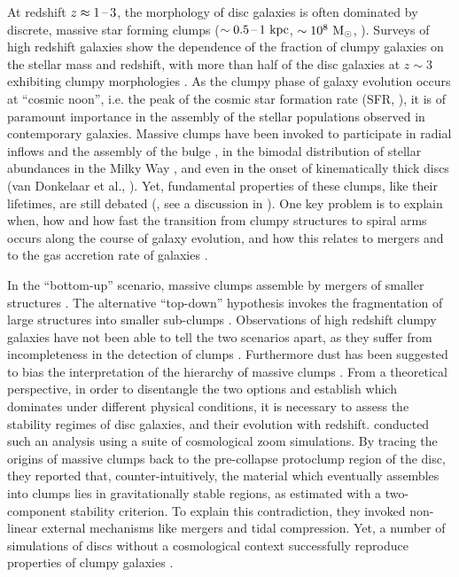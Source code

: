 \documentclass[useAMS,usenatbib]{mnras}
\begin{document}
At redshift $z\approx 1\textrm{\,--\,} 3$, the morphology of disc galaxies is often dominated by discrete, massive star forming clumps ($\sim 0.5 \textrm{\,--\,} 1 \mathrm{~kpc}$, $\sim 10^8 \mathrm{~M}_{\odot}$, \citealt{Cowie1995, Elmegreen2007, Elmegreen2009, Wuyts2012, Swinbank2015, Zanella2015, Fisher2017, Guo2018}). Surveys of high redshift galaxies show the dependence of the fraction of clumpy galaxies on the stellar mass and redshift, with more than half of the disc galaxies at $z\sim 3$ exhibiting clumpy morphologies \citep{Guo2015}. As the clumpy phase of galaxy evolution occurs at ``cosmic noon'', i.e. the peak of the cosmic star formation rate (SFR, \citealt{Madau2014}), it is of paramount importance in the assembly of the stellar populations observed in contemporary galaxies. Massive clumps have been invoked to participate in radial inflows and the assembly of the bulge \citep{Noguchi1999, Ceverino2010, Bournaud2014}, in the bimodal distribution of stellar abundances in the Milky Way \citep{Clarke2019, Khoperskov2021, Renaud2021}, and even in the onset of kinematically thick discs (van Donkelaar et al., \inprep). Yet, fundamental properties of these clumps, like their lifetimes, are still debated (\citealt{Genel2012, Mandelker2014, Mandelker2017, Oklopcic2017}, see a discussion in \citealt{Fensch2021}). One key problem is to explain when, how and how fast the transition from clumpy structures to spiral arms occurs along the course of galaxy evolution, and how this relates to mergers and to the gas accretion rate of galaxies \citep{Bournaud2007, Agertz2009b, Dekel2009, Ceverino2012, Cacciato2012}.

In the ``bottom-up'' scenario, massive clumps assemble by mergers of smaller structures \citep{Behrendt2016, Behrendt2019, Benincasa2019}. The alternative ``top-down'' hypothesis invokes the fragmentation of large structures into smaller sub-clumps \citep[see a discussion in][]{Behrendt2019}. Observations of high redshift clumpy galaxies have not been able to tell the two scenarios apart, as they suffer from incompleteness in the detection of clumps \citep{Tamburello2017, Faure2021}. Furthermore dust has been suggested to bias the interpretation of the hierarchy of massive clumps \citep{Buck2017}. From a theoretical perspective, in order to disentangle the two options and establish which dominates under different physical conditions, it is necessary to assess the stability regimes of disc galaxies, and their evolution with redshift. \citet{Inoue2016} conducted such an analysis using a suite of cosmological zoom simulations. By tracing the origins of massive clumps back to the pre-collapse protoclump region of the disc, they reported that, counter-intuitively, the material which eventually assembles into clumps lies in gravitationally stable regions, as estimated with a two-component stability criterion. To explain this contradiction, they invoked non-linear external mechanisms like mergers and tidal compression. Yet, a number of simulations of discs without a cosmological context successfully reproduce properties of clumpy galaxies \citep[e.g.][]{Bournaud2014, Perret2014, Fensch2017, Clarke2019}.
\end{document}
